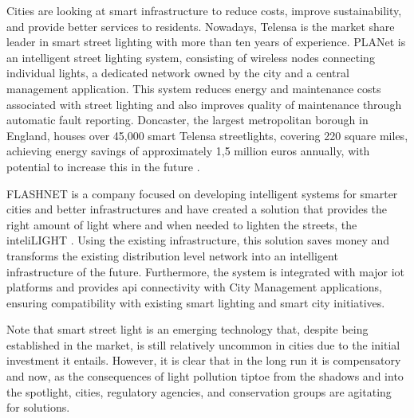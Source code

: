 Cities are looking at smart infrastructure to reduce costs, improve sustainability, and provide better services to residents. Nowadays, Telensa is the market share leader in smart street lighting with more than ten years of experience. PLANet is an  intelligent street lighting system, consisting of wireless nodes connecting individual lights, a dedicated network owned by the city and a central management application. This system reduces energy and maintenance costs associated with street lighting and also improves quality of maintenance through automatic fault reporting. Doncaster, the largest metropolitan borough in England, houses over 45,000 smart Telensa streetlights, covering 220 square miles, achieving energy savings of approximately 1,5 million euros annually, with potential to increase this in the future \cite{telensa}.

FLASHNET is a company focused on developing intelligent systems for smarter cities and better infrastructures and have created a solution that provides the right amount of light where and when needed to lighten the streets, the inteliLIGHT \cite{inteli_light}. Using the existing infrastructure, this solution saves money and transforms the existing distribution level network into an intelligent infrastructure of the future. Furthermore, the system is integrated with major \ac{iot} platforms and provides \ac{api} connectivity with City Management applications, ensuring compatibility with existing smart lighting and smart city initiatives.

Note that smart street light is an emerging technology that, despite being established in the market, is still relatively uncommon in cities due to the initial investment it entails. However, it is clear that in the long run it is compensatory and now, as the consequences of light pollution tiptoe from the shadows and into the spotlight, cities, regulatory agencies, and conservation groups are agitating for solutions.
